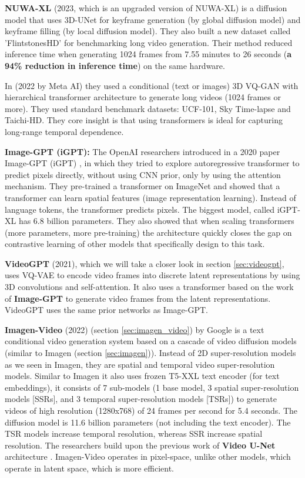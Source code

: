 \textbf{NUWA-XL} \cite{nuwa_xl} (2023, which is an upgraded version of NUWA-XL) is a diffusion model that uses 3D-UNet for keyframe generation (by global diffusion model) and keyframe filling (by local diffusion model). They also built a new dataset called 'FlintstonesHD' for benchmarking long video generation. Their method reduced inference time when generating 1024 frames from 7.55 minutes to 26 seconds (\textbf{a 94\% reduction in inference time}) on the same hardware.

In \cite{ge2022long} (2022 by Meta AI) they used a conditional (text or images) 3D VQ-GAN with hierarchical transformer architecture to generate long videos (1024 frames or more). They used standard benchmark datasets: UCF-101, Sky Time-lapse and Taichi-HD. They core insight is that using transformers is ideal for capturing long-range temporal dependence.

\textbf{Image-GPT (iGPT):} The OpenAI researchers introduced in a 2020 paper Image-GPT (iGPT) \cite{imagegpt}, in which they tried to explore autoregressive transformer to predict pixels directly, without using CNN prior, only by using the attention mechanism. They pre-trained a transformer on ImageNet and showed that a transformer can learn spatial features (image representation learning). Instead of language tokens, the transformer predicts pixels. The biggest model, called iGPT-XL has 6.8 billion parameters. They also showed that when scaling transformers (more parameters, more pre-training) the architecture quickly closes the gap on contrastive learning of other models that specifically design to this task.

\textbf{VideoGPT} \cite{videogpt} (2021), which we will take a closer look in section \ref{sec:videogpt}, uses VQ-VAE to encode video frames into discrete latent representations by using 3D convolutions and self-attention. It also uses a transformer based on the work of \textbf{Image-GPT} \cite{imagegpt} to generate video frames from the latent representations. VideoGPT uses the same prior networks as Image-GPT.

\textbf{Imagen-Video} \cite{imagen_video} (2022) (section \ref{sec:imagen_video}) by Google is a text conditional video generation system based on a cascade of video diffusion models (similar to Imagen (section \ref{sec:imagen})). Instead of 2D super-resolution models as we seen in Imagen, they are spatial and temporal video super-resolution models. Similar to Imagen it also uses frozen T5-XXL \cite{t5_model} text encoder (for text embeddings), it consists of 7 sub-models (1 base model, 3 spatial super-resolution models [SSRs], and 3 temporal super-resolution models [TSRs]) to generate videos of high resolution (1280x768) of 24 frames per second for 5.4 seconds. The diffusion model is 11.6 billion parameters (not including the text encoder). The TSR models increase temporal resolution, whereas SSR increase spatial resolution. The researchers build upon the previous work of \textbf{Video U-Net} architecture \cite{video_diffusion_models}. Imagen-Video operates in pixel-space, unlike other models, which operate in latent space, which is more efficient.

